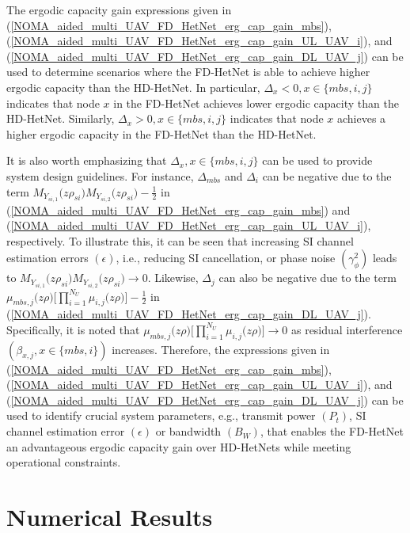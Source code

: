 The ergodic capacity gain expressions given in (\ref{NOMA_aided_multi_UAV_FD_HetNet_erg_cap_gain_mbs}), (\ref{NOMA_aided_multi_UAV_FD_HetNet_erg_cap_gain_UL_UAV_i}), and (\ref{NOMA_aided_multi_UAV_FD_HetNet_erg_cap_gain_DL_UAV_j}) can be used to determine scenarios where the FD-HetNet is able to achieve higher ergodic capacity than the HD-HetNet. In particular, $\Delta_{x} < 0, x \in \{mbs, i, j\}$ indicates that node $x$ in the FD-HetNet achieves lower ergodic capacity than the HD-HetNet. Similarly, $\Delta_{x} > 0, x \in \{mbs, i, j\}$ indicates that node $x$ achieves a higher ergodic capacity in the FD-HetNet than the HD-HetNet. 

It is also worth emphasizing that $\Delta_{x}, x \in \{mbs, i, j\}$ can be used to provide system design guidelines. For instance, $\Delta_{mbs}$ and $\Delta_i$ can be negative due to the term $M_{Y_{si,1}}\big(z\rho_{si}\big) M_{Y_{si,2}}\big(z\rho_{si} \big) - \frac{1}{2}$ in (\ref{NOMA_aided_multi_UAV_FD_HetNet_erg_cap_gain_mbs}) and (\ref{NOMA_aided_multi_UAV_FD_HetNet_erg_cap_gain_UL_UAV_i}), respectively. To illustrate this, it can be seen that increasing SI channel estimation errors $(\epsilon)$, i.e., reducing SI cancellation, or phase noise $(\gamma_{\phi}^2)$ leads to $M_{Y_{si,1}}\big(z\rho_{si}\big) M_{Y_{si,2}}\big(z\rho_{si} \big) \to 0$. Likewise, $\Delta_j$ can also be negative due to the term $\mu_{mbs,j}\big(z\rho\big) \big[ \prod_{i=1}^{N_U} \mu_{i,j}\big(z\rho\big) \big] - \frac{1}{2}$ in (\ref{NOMA_aided_multi_UAV_FD_HetNet_erg_cap_gain_DL_UAV_j}). Specifically, it is noted that $\mu_{mbs,j}\big(z\rho\big) \big[ \prod_{i=1}^{N_U} \mu_{i,j}\big(z\rho\big) \big] \to 0$ as residual interference $(\beta_{x,j}, x \in \{mbs,i\})$ increases. Therefore, the expressions given in (\ref{NOMA_aided_multi_UAV_FD_HetNet_erg_cap_gain_mbs}), (\ref{NOMA_aided_multi_UAV_FD_HetNet_erg_cap_gain_UL_UAV_i}), and (\ref{NOMA_aided_multi_UAV_FD_HetNet_erg_cap_gain_DL_UAV_j}) can be used to identify crucial system parameters, e.g., transmit power $(P_t)$, SI channel estimation error $(\epsilon)$ or bandwidth $(B_W)$, that enables the FD-HetNet an advantageous ergodic capacity gain over HD-HetNets while meeting operational constraints.

\section{Numerical Results} \label{NOMA_aided_multi_UAV_FD_HetNet_sec_num_res}

